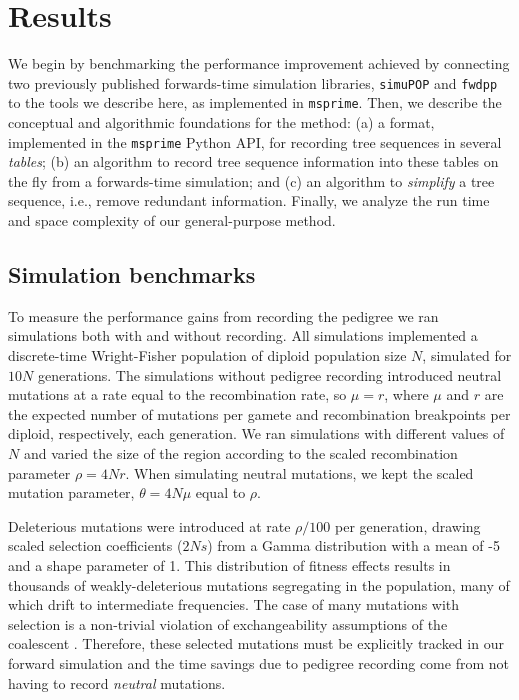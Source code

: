 \documentclass{article}
\newcommand{\simupop}{\texttt{simuPOP}}
\newcommand{\fwdpp}{\texttt{fwdpp}}
\newcommand{\msprime}{\texttt{msprime}}
\begin{document}
\section*{Results}


We begin by benchmarking the performance improvement achieved by connecting
two previously published forwards-time simulation libraries,
\simupop{} \citep{peng2005simupop} and \fwdpp{} \citep{fwdpp}
to the tools we describe here, as implemented in \msprime{}.
Then, we describe the conceptual and algorithmic foundations for the method:
(a) a format, implemented in the \msprime{} Python API,
for recording tree sequences in several \emph{tables};
(b) an algorithm to record tree sequence information into these tables on the fly
    from a forwards-time simulation;
and (c) an algorithm to \emph{simplify} a tree sequence, i.e., remove redundant information.
Finally, we analyze the run time and space complexity of our general-purpose method.


\subsection*{Simulation benchmarks}

To measure the performance gains from recording the pedigree we ran simulations both with and without recording.
All simulations implemented a discrete-time Wright-Fisher population of diploid
population size $N$, simulated for $10N$ generations.
The simulations without pedigree recording introduced neutral mutations at a rate
equal to the recombination rate,
so $\mu = r$, where $\mu$ and $r$ are the expected number of mutations per gamete and recombination breakpoints per
diploid,
respectively, each generation. 
We ran simulations with different values of $N$ and varied the size of the region according to the scaled recombination
parameter $\rho = 4Nr$.  When simulating neutral mutations, we kept the scaled mutation parameter, $\theta = 4N\mu$
equal to $\rho$.

Deleterious mutations were introduced at rate $\rho/100$ per generation, drawing scaled selection
coefficients ($2Ns$)
from a Gamma distribution with a mean of -5 and a shape parameter of 1.  This distribution of fitness effects results in
thousands of weakly-deleterious mutations segregating in the population, many of which drift to intermediate
frequencies.  The case of many mutations with selection is a non-trivial violation of exchangeability assumptions of the
coalescent \citep{Neuhauser1997-nn}.  Therefore, these selected mutations must be explicitly tracked in our forward simulation
and the time savings due to pedigree recording come from not having to record \textit{neutral} mutations.
\end{document}
